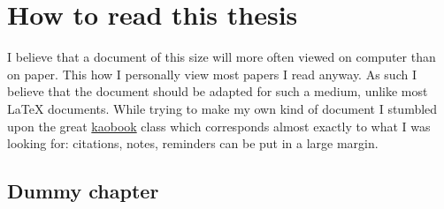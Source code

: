 \chapter*{How to read this thesis}

I believe that a document of this size will more often viewed on computer than
on paper. This how I personally view most papers I read anyway.
As such I believe that the document should be adapted for such a medium, unlike
most \LaTeX{} documents.
While trying to make my own kind of document I stumbled upon the great
\href{https://github.com/fmarotta/kaobook/}{kaobook} class which corresponds
almost exactly to what I was looking for: citations, notes, reminders can be put
in a large margin.

\begin{minidocument}
  \chapter{Dummy chapter}

  \blindtext~

  \marginnote[1cm]{\blindtext}
  \marginnote[4cm]{\blindtext}
  \marginnote[10cm]{\blindtext}
  \Blindtext
\end{minidocument}

\begin{figure}[hb]
  \lastminidocument
\end{figure}